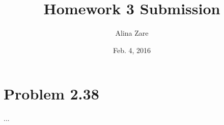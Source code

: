 \documentclass[11pt]{article}
\author{Alina Zare}
\title{Homework 3 Submission  }
\date{Feb. 4, 2016}                                         %
\begin{document}
\maketitle


\section{Problem 2.38}
...
\end{document}
